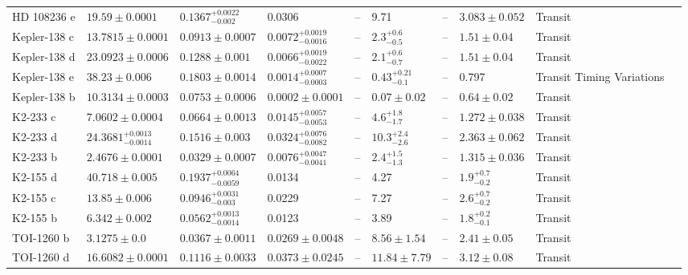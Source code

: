\begin{tabular}{llllllllll}
HD 108236 e & $19.59 \pm 0.0001$ & $0.1367^{+0.0022}_{-0.002}$ & 0.0306 & -- & 9.71 & -- & $3.083 \pm 0.052$ & Transit & \cite{BONFANTI_ET_AL__2021} \\
Kepler-138 c & $13.7815 \pm 0.0001$ & $0.0913 \pm 0.0007$ & $0.0072^{+0.0019}_{-0.0016}$ & -- & $2.3^{+0.6}_{-0.5}$ & -- & $1.51 \pm 0.04$ & Transit & \cite{PIAULET_ET_AL_2023} \\
Kepler-138 d & $23.0923 \pm 0.0006$ & $0.1288 \pm 0.001$ & $0.0066^{+0.0019}_{-0.0022}$ & -- & $2.1^{+0.6}_{-0.7}$ & -- & $1.51 \pm 0.04$ & Transit & \cite{PIAULET_ET_AL_2023} \\
Kepler-138 e & $38.23 \pm 0.006$ & $0.1803 \pm 0.0014$ & $0.0014^{+0.0007}_{-0.0003}$ & -- & $0.43^{+0.21}_{-0.1}$ & -- & 0.797 & Transit Timing Variations & \cite{PIAULET_ET_AL_2023} \\
Kepler-138 b & $10.3134 \pm 0.0003$ & $0.0753 \pm 0.0006$ & $0.0002 \pm 0.0001$ & -- & $0.07 \pm 0.02$ & -- & $0.64 \pm 0.02$ & Transit & \cite{PIAULET_ET_AL_2023} \\
K2-233 c & $7.0602 \pm 0.0004$ & $0.0664 \pm 0.0013$ & $0.0145^{+0.0057}_{-0.0053}$ & -- & $4.6^{+1.8}_{-1.7}$ & -- & $1.272 \pm 0.038$ & Transit & \cite{BARRAG_AMP_AACUTE_N_ET_AL__2023} \\
K2-233 d & $24.3681^{+0.0013}_{-0.0014}$ & $0.1516 \pm 0.003$ & $0.0324^{+0.0076}_{-0.0082}$ & -- & $10.3^{+2.4}_{-2.6}$ & -- & $2.363 \pm 0.062$ & Transit & \cite{BARRAG_AMP_AACUTE_N_ET_AL__2023} \\
K2-233 b & $2.4676 \pm 0.0001$ & $0.0329 \pm 0.0007$ & $0.0076^{+0.0047}_{-0.0041}$ & -- & $2.4^{+1.5}_{-1.3}$ & -- & $1.315 \pm 0.036$ & Transit & \cite{BARRAG_AMP_AACUTE_N_ET_AL__2023} \\
K2-155 d & $40.718 \pm 0.005$ & $0.1937^{+0.0064}_{-0.0059}$ & 0.0134 & -- & 4.27 & -- & $1.9^{+0.7}_{-0.2}$ & Transit & \cite{D_IACUTE_EZ_ALONSO_ET_AL__2018} \\
K2-155 c & $13.85 \pm 0.006$ & $0.0946^{+0.0031}_{-0.003}$ & 0.0229 & -- & 7.27 & -- & $2.6^{+0.7}_{-0.2}$ & Transit & \cite{D_IACUTE_EZ_ALONSO_ET_AL__2018} \\
K2-155 b & $6.342 \pm 0.002$ & $0.0562^{+0.0013}_{-0.0014}$ & 0.0123 & -- & 3.89 & -- & $1.8^{+0.2}_{-0.1}$ & Transit & \cite{D_IACUTE_EZ_ALONSO_ET_AL__2018} \\
TOI-1260 b & $3.1275 \pm 0.0$ & $0.0367 \pm 0.0011$ & $0.0269 \pm 0.0048$ & -- & $8.56 \pm 1.54$ & -- & $2.41 \pm 0.05$ & Transit & \cite{LAM_ET_AL_2023} \\
TOI-1260 d & $16.6082 \pm 0.0001$ & $0.1116 \pm 0.0033$ & $0.0373 \pm 0.0245$ & -- & $11.84 \pm 7.79$ & -- & $3.12 \pm 0.08$ & Transit & \cite{LAM_ET_AL_2023} \\

\end{tabular}
